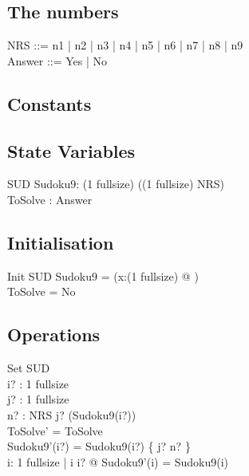 \documentclass{article}
\begin{document}
\subsection*{The numbers}
\begin{zed}
  NRS ::= n1 | n2 | n3 | n4 | n5 | n6 | n7 | n8 | n9\\
  Answer ::= Yes | No
\end{zed}


\subsection*{Constants}

\subsection*{State Variables}

\begin{schema}{SUD}
  Sudoku9: (1 \upto fullsize) \fun ((1 \upto fullsize) \pfun NRS)\\
  ToSolve : Answer
\end{schema}


\subsection*{Initialisation}
\begin{schema}{Init}
  SUD
  \where
  Sudoku9 = (\lambda x:(1 \upto fullsize) @ \emptyset)\\
  ToSolve = No
\end{schema}


\subsection*{Operations}
\begin{schema}{Set}
  \Delta SUD\\
  i? : 1 \upto fullsize\\
  j? : 1 \upto fullsize\\
  n? : NRS
  \where
  j? \notin \dom(Sudoku9(i?))\\
  ToSolve' = ToSolve\\
  Sudoku9'(i?) = Sudoku9(i?) \cup \{ j? \mapsto n? \} \\
  \forall i: 1 \upto fullsize | i \neq i? @ Sudoku9'(i) = Sudoku9(i)
\end{schema}
\end{document}
